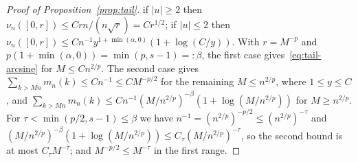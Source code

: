 \begin{proof}[Proof of Proposition~\ref{prop:tail}]
if $|u|\ge2$ then $\nu_n([0,r])\le Crn/(n\sqrt r)=Cr^{1/2}$; if $|u|\le2$ then
$\nu_n([0,r])\le Cn^{-1}y^{1+\min(\alpha,0)}(1+\log(C/y))$. With $r=M^{-p}$ and $p(1+\min(\alpha,0))=\min(p,s-1)=:\beta$, the
first case gives~\eqref{eq:tail-arcsine} for $M\le Cn^{2/p}$. The second case gives $\sum_{k>Mn}m_n(k)\le Cn^{-1}\le CM^{-p/2}$
for the remaining $M\le n^{2/p}$, where $1\le y\le C$, and
$\sum_{k>Mn}m_n(k)\le Cn^{-1}(M/n^{2/p})^{-\beta}(1+\log(M/n^{2/p}))$ for $M\ge n^{2/p}$. For $\tau<\min(p/2,s-1)\le\beta$ we have
$n^{-1}=(n^{2/p})^{-p/2}\le(n^{2/p})^{-\tau}$ and $(M/n^{2/p})^{-\beta}(1+\log(M/n^{2/p}))\le C_\tau(M/n^{2/p})^{-\tau}$, so the
second bound is at most $C_\tau M^{-\tau}$; and $M^{-p/2}\le M^{-\tau}$ in the first range.
\end{proof}
